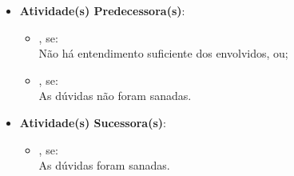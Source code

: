 \begin{itemize}
{\begin{itemize}
						\end{itemize}}
					\item{\textbf{Atividade(s) Predecessora(s)}:
						\begin{itemize}
							\item{, se:
								\\ Não há entendimento suficiente dos envolvidos, ou;}
							\item{, se:
								\\ As dúvidas não foram sanadas.}
						\end{itemize}}
					\item{\textbf{Atividade(s) Sucessora(s)}:
						\begin{itemize}
							\item{, se:
								\\ As dúvidas foram sanadas.}
						\end{itemize}}
				\end{itemize}


